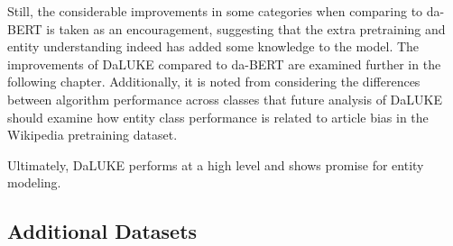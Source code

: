 \documentclass[main.tex]{subfiles}
\begin{document}
Still, the considerable improvements in some categories when comparing to da-BERT is taken as an encouragement, suggesting that the extra pretraining and entity understanding indeed has added some knowledge to the model.
The improvements of DaLUKE compared to da-BERT are examined further in the following chapter.
Additionally, it is noted from considering the differences between algorithm performance across classes that future analysis of DaLUKE should examine how entity class performance is related to article bias in the Wikipedia pretraining dataset.

Ultimately, DaLUKE performs at a high level and shows promise for entity modeling.

\subsection{Additional Datasets}



\end{document}
